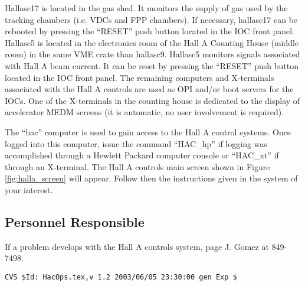 Hallasc17 is located in the gas shed.
It monitors the supply of gas used by the tracking chambers (i.e. VDCs and FPP chambers).
If necessary, hallasc17 can be rebooted by pressing the ``RESET'' push button located in the IOC front panel.
Hallasc5 is located in the electronics room of the Hall A Counting House (middle room) in the same VME crate than hallasc9.
Hallasc5 monitors signals associated with Hall A beam current. It can be reset by pressing the ``RESET'' push button located in the
IOC front panel. The remaining computers and X-terminals associated with the Hall A controls are used as OPI and/or boot servers for the
IOCs. One of the X-terminals in the counting house is dedicated to the display of accelerator MEDM screens 
(it is automatic, no user involvement is required).

The ``hac'' computer is used to gain access to the Hall A control systems. Once logged into this computer, issue the command ``HAC\_hp''
if logging was accomplished through a Hewlett Packard computer console or ``HAC\_xt'' if through an X-terminal.
The Hall A controls main screen shown in Figure \ref{fig:halla_screen} will appear. Follow then the instructions given in the system of your interest.


\subsection{Personnel Responsible}
If a problem develops with the Hall A controls system, page J. Gomez at 849-7498. 


%
%
{\small
\begin{verbatim}CVS $Id: HacOps.tex,v 1.2 2003/06/05 23:30:00 gen Exp $\end{verbatim}
}
